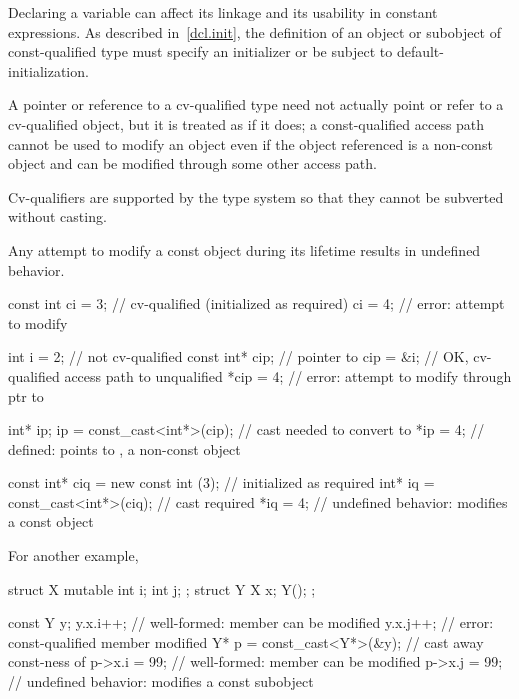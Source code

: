 \pnum
\begin{note}
Declaring a variable  can affect its linkage
and its usability in constant expressions. As
described in~\ref{dcl.init}, the definition of an object or subobject
of const-qualified type must specify an initializer or be subject to
default-initialization.
\end{note}

\pnum
A pointer or reference to a cv-qualified type need not actually point or
refer to a cv-qualified object, but it is treated as if it does; a
const-qualified access path cannot be used to modify an object even if
the object referenced is a non-const object and can be modified through
some other access path.
\begin{note}
Cv-qualifiers are supported by the type system so that they cannot be
subverted without casting.
\end{note}

\pnum
{}%
Any attempt to modify a
const object during its
lifetime results in undefined behavior.
\begin{example}
\begin{codeblock}
const int ci = 3;                       // cv-qualified (initialized as required)
ci = 4;                                 // error: attempt to modify 

int i = 2;                              // not cv-qualified
const int* cip;                         // pointer to 
cip = &i;                               // OK, cv-qualified access path to unqualified
*cip = 4;                               // error: attempt to modify through ptr to 

int* ip;
ip = const_cast<int*>(cip);             // cast needed to convert  to 
*ip = 4;                                // defined:  points to , a non-const object

const int* ciq = new const int (3);     // initialized as required
int* iq = const_cast<int*>(ciq);        // cast required
*iq = 4;                                // undefined behavior: modifies a const object
\end{codeblock}
For another example,
\begin{codeblock}
struct X {
  mutable int i;
  int j;
};
struct Y {
  X x;
  Y();
};

const Y y;
y.x.i++;                                // well-formed:  member can be modified
y.x.j++;                                // error: const-qualified member modified
Y* p = const_cast<Y*>(&y);              // cast away const-ness of 
p->x.i = 99;                            // well-formed:  member can be modified
p->x.j = 99;                            // undefined behavior: modifies a const subobject
\end{codeblock}
\end{example}

